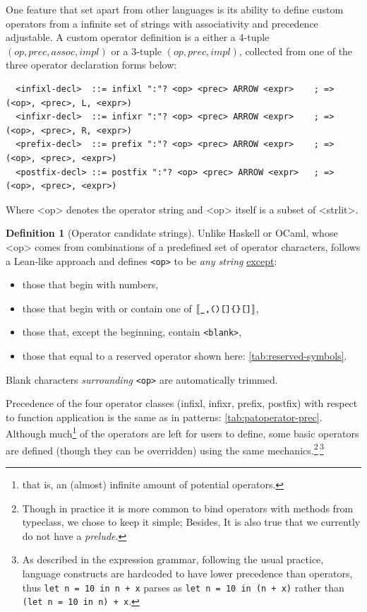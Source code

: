 \documentclass[a4paper, 11pt]{article}
\theoremstyle{remark}\newtheorem*{remark}{Remark}
\theoremstyle{definition}\newtheorem*{definition}{Definition}
\begin{document}
One feature that set \Tigris apart from other languages is its ability to define custom
operators from a infinite set of strings with associativity and precedence adjustable.
A custom operator definition is a either a 4-tuple \((op, prec, assoc, impl)\) or a 3-tuple \((op, prec, impl)\), collected
from one of the three operator declaration forms below:
\begin{verbatim}
  <infixl-decl>  ::= infixl ":"? <op> <prec> ARROW <expr>    ; => (<op>, <prec>, L, <expr>)
  <infixr-decl>  ::= infixr ":"? <op> <prec> ARROW <expr>    ; => (<op>, <prec>, R, <expr>)
  <prefix-decl>  ::= prefix ":"? <op> <prec> ARROW <expr>    ; => (<op>, <prec>, <expr>)
  <postfix-decl> ::= postfix ":"? <op> <prec> ARROW <expr>   ; => (<op>, <prec>, <expr>)
\end{verbatim}
Where <op> denotes the operator string and <op> itself is a subset of <strlit>.
\begin{definition}[Operator candidate strings]
  Unlike Haskell or OCaml, whose <op> comes from combinations of a predefined set of operator characters,
  \Tigris follows a Lean-like approach and defines \texttt{<op>} to be \emph{any string} \underline{except}:
  \begin{itemize}
    \item those that begin with numbers,
    \item those that begin with or contain one of \(\llbracket \texttt{\_,()[]\{\}[]} \rrbracket\),
    \item those that, except the beginning, contain \texttt{<blank>},
    \item those that equal to a reserved operator shown here: \autoref{tab:reserved-symbols}.
  \end{itemize}
  Blank characters \emph{surrounding} \texttt{<op>} are automatically trimmed.
\end{definition}
Precedence of the four operator classes (infixl, infixr, prefix, postfix)  with respect to function application is the same as in patterns: \autoref{tab:patoperator-prec}.
Although much\footnote{that is, an (almost) infinite amount of potential operators.} of the operators
are left for users to define, some basic operators are defined (though they can be overridden)
using the same mechanics.\footnote{Though in practice it is more common to bind operators with methods from typeclass,
  we chose to keep it simple; Besides, It is also true that we currently do not have a \emph{prelude}.
}\,\footnote{As described in the expression grammar, following the usual practice,
  language constructs are hardcoded to have lower precedence than operators, thus
  \texttt{let n = 10 in n + x}
  parses as \texttt{let n = 10 in (n + x)}
rather than \texttt{(let n = 10 in n) + x}.}
\end{document}
